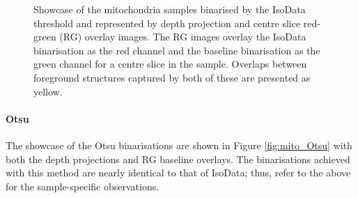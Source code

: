 \begin{figure}
	\caption[Showcase of the mitochondria samples binarised by the IsoData threshold and represented by depth projection and red-green overlay images.]{Showcase of the mitochondria samples binarised by the IsoData threshold and represented by depth projection and centre slice red-green (RG) overlay images. The RG images overlay the IsoData binarisation as the red channel and the baseline binarisation as the green channel for a centre slice in the sample. Overlaps between foreground structures captured by both of these are presented as yellow.}
	\label{fig:mito_IsoData}
\end{figure}

\paragraph{Otsu}
The showcase of the Otsu binarisations are shown in Figure \ref{fig:mito_Otsu} with both the depth projections and RG baseline overlays. The binarisations achieved with this method are nearly identical to that of IsoData; thus, refer to the above for the sample-specific observations.

